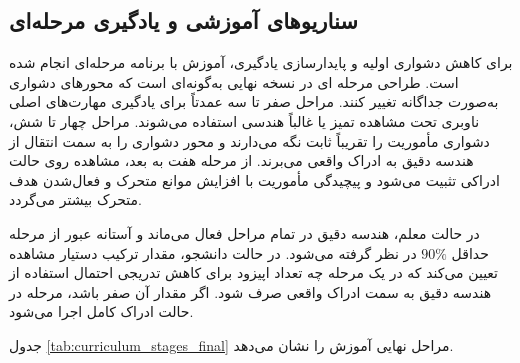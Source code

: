 \subsection{سناریوهای آموزشی و یادگیری مرحله‌ای}
\label{subsec:curriculum_learning_final}

برای کاهش دشواری اولیه و پایدارسازی یادگیری، آموزش با برنامه مرحله‌ای انجام شده است. طراحی مرحله ای در نسخه نهایی به‌گونه‌ای است که محورهای دشواری به‌صورت جداگانه تغییر کنند. مراحل صفر تا سه عمدتاً برای یادگیری مهارت‌های اصلی ناوبری تحت مشاهده تمیز یا غالباً هندسی استفاده می‌شوند. مراحل چهار تا شش، دشواری مأموریت را تقریباً ثابت نگه می‌دارند و محور دشواری را به سمت انتقال از هندسه دقیق به ادراک واقعی می‌برند. از مرحله هفت به بعد، مشاهده روی حالت ادراکی تثبیت می‌شود و پیچیدگی مأموریت با افزایش موانع متحرک و فعال‌شدن هدف متحرک بیشتر می‌گردد.

در حالت معلم، هندسه دقیق در تمام مراحل فعال می‌ماند و آستانه عبور از مرحله حداقل \(90\%\) در نظر گرفته می‌شود. در حالت دانشجو، مقدار ترکیب دستیار مشاهده تعیین می‌کند که در یک مرحله چه تعداد اپیزود برای کاهش تدریجی احتمال استفاده از هندسه دقیق به سمت ادراک واقعی صرف شود. اگر مقدار آن صفر باشد، مرحله در حالت ادراک کامل اجرا می‌شود.

جدول \ref{tab:curriculum_stages_final} مراحل نهایی آموزش را نشان می‌دهد.

\begin{table}[htbp]
	\centering
	\caption{مراحل یادگیری مرحله‌ای در آموزش عامل}
	\label{tab:curriculum_stages_final}
\end{table}

